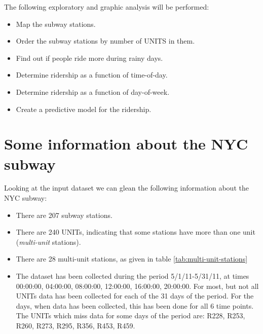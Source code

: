 \documentclass{article}
\begin{document}
The following exploratory and graphic analysis will be performed:
\begin{itemize}
\item Map the subway stations.
\item Order the subway stations by number of UNITS in them.
\item Find out if people ride more during rainy days.
\item Determine ridership as a function of time-of-day.
\item Determine ridership as a function of day-of-week.
\item Create a predictive model for the ridership.


\end{itemize}

\section{Some information about the NYC subway}

Looking at the input dataset we can glean the following information about the NYC subway:
\begin{itemize}
\item There are 207 subway stations.
\item There are 240 UNITs, indicating that some stations have more than one unit (\emph{multi-unit} stations).
\item There are 28 multi-unit stations, as given in table \ref{tab:multi-unit-stations}
\item The dataset has been collected during the period 5/1/11-5/31/11, at times 00:00:00, 04:00:00, 08:00:00, 12:00:00, 16:00:00, 20:00:00. For most, but not all UNITs data has been collected for each of the 31 days of the period. For the days, when data has been collected, this has been done for all 6 time points. The UNITs  which miss data for some days of the period are: R228, R253, R260, R273, R295, R356, R453, R459.
\end{itemize}
\end{document}
